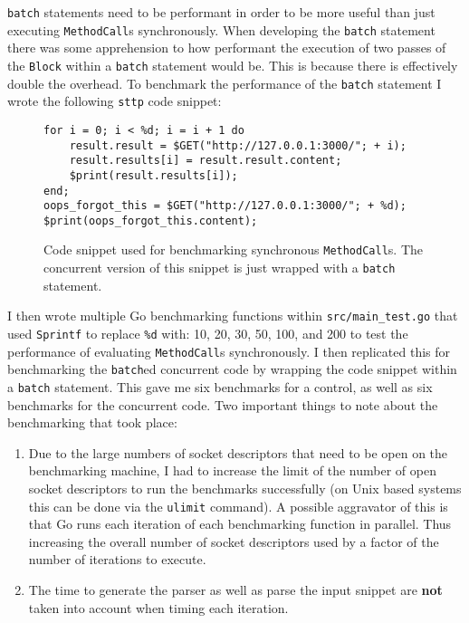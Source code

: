 \verb|batch| statements need to be performant in order to be more useful than just executing \verb|MethodCall|s synchronously. When developing the \verb|batch| statement there was some apprehension to how performant the execution of two passes of the \verb|Block| within a \verb|batch| statement would be. This is because there is effectively double the overhead. To benchmark the performance of the \verb|batch| statement I wrote the following \verb|sttp| code snippet:

\begin{figure}[H]
    \begin{verbatim}
for i = 0; i < %d; i = i + 1 do
    result.result = $GET("http://127.0.0.1:3000/"; + i);
    result.results[i] = result.result.content;
    $print(result.results[i]);
end;
oops_forgot_this = $GET("http://127.0.0.1:3000/"; + %d);
$print(oops_forgot_this.content);
    \end{verbatim}
    \cprotect\caption{Code snippet used for benchmarking synchronous \verb|MethodCall|s. The concurrent version of this snippet is just wrapped with a \verb|batch| statement.}
    \label{sec:eval-ast-nodes-batch-bench-snippet}
\end{figure}

I then wrote multiple Go benchmarking functions within \verb|src/main_test.go| that used \verb|Sprintf| to replace \verb|%d| with: 10, 20, 30, 50, 100, and 200 to test the performance of evaluating \verb|MethodCall|s synchronously. I then replicated this for benchmarking the \verb|batch|ed concurrent code by wrapping the code snippet within a \verb|batch| statement. This gave me six benchmarks for a control, as well as six benchmarks for the concurrent code. Two important things to note about the benchmarking that took place:

\begin{enumerate}
    \item Due to the large numbers of socket descriptors that need to be open on the benchmarking machine, I had to increase the limit of the number of open socket descriptors to run the benchmarks successfully (on Unix based systems this can be done via the \verb|ulimit| command). A possible aggravator of this is that Go runs each iteration of each benchmarking function in parallel. Thus increasing the overall number of socket descriptors used by a factor of the number of iterations to execute.
    \item The time to generate the parser as well as parse the input snippet are \textbf{not} taken into account when timing each iteration.
\end{enumerate}


